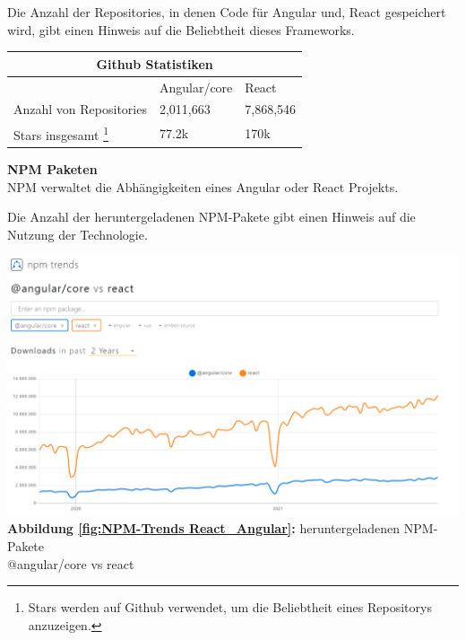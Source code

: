 Die Anzahl der Repositories, in denen Code für Angular und, React gespeichert wird, gibt einen Hinweis auf die Beliebtheit dieses Frameworks.
\\
\begin{table}[h!]
  \centering
  \begin{tabular}{ |p{5cm}||p{3.6cm}|p{3.6cm}|  }
    \hline
    \multicolumn{3}{|c|}{Github Statistiken}                                                                                                  \\
    \hline
                                                                                                                   & Angular/core & React     \\
    \hline
    Anzahl von     Repositories                                                                                    & 2,011,663    & 7,868,546
    \\

    \hline
    Stars insgesamt \footnote{Stars werden auf Github verwendet, um die Beliebtheit eines Repositorys anzuzeigen.} & 77.2k        & 170k
    \\
    \hline
  \end{tabular}
\end{table}

{\cite{GH04, GH06}}%

\begin{flushleft}

\textbf{NPM Paketen}\\
NPM verwaltet die Abhängigkeiten eines Angular oder React Projekts.

Die Anzahl der heruntergeladenen NPM-Pakete gibt einen Hinweis auf die Nutzung der Technologie.
\end{flushleft}

\begin{center}
  \includegraphics[scale=0.4]
  {sources/NPM-Trends React_Angular}\label{fig:NPM-Trends React_Angular}\\
  \textbf{Abbildung \autoref{fig:NPM-Trends React_Angular}:} heruntergeladenen NPM-Pakete \\@angular/core vs react
    {\cite{NPM01}}
\end{center}

